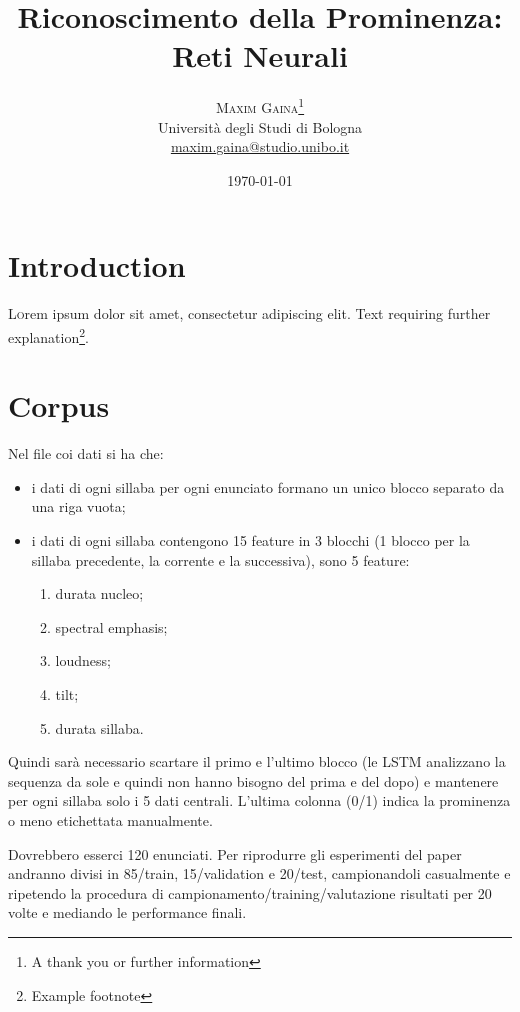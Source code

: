 \documentclass[twoside,twocolumn]{article}
\title{Riconoscimento della Prominenza: Reti Neurali} %
\author{%
\textsc{Maxim Gaina}\thanks{A thank you or further information} \\[1ex] %
\normalsize Università degli Studi di Bologna \\ %
\normalsize \href{mailto:maxim.gaina@studio.unibo.it}{maxim.gaina@studio.unibo.it}
}
\date{\today} %
\theoremstyle{definition}
\begin{document}
\maketitle

\section{Introduction}
	\lettrine[nindent=0em,lines=3]{L} orem ipsum dolor sit amet, consectetur adipiscing elit.
	Text requiring further explanation\footnote{Example footnote}.

\section{Corpus}
	Nel file coi dati si ha che:
	\begin{itemize}
		\item i dati di ogni sillaba per ogni enunciato formano un unico blocco separato da una riga vuota;
		\item i dati di ogni sillaba contengono 15 feature in 3 blocchi (1 blocco per la sillaba precedente, la corrente e la successiva), sono 5 feature:
		\begin{enumerate}
			\item durata nucleo;
			\item spectral emphasis;
			\item loudness;
			\item tilt;
			\item durata sillaba.
		\end{enumerate}
	\end{itemize}
	Quindi sarà necessario scartare il primo e l'ultimo blocco (le LSTM analizzano la 
	sequenza da sole e quindi non hanno bisogno del prima e del dopo) e mantenere per ogni sillaba solo i 5 dati centrali. L'ultima colonna (0/1) indica la prominenza o meno etichettata manualmente.
	
	Dovrebbero esserci 120 enunciati. Per riprodurre gli esperimenti del paper \cite{bib:prominence-detection-italian} andranno divisi in 85/train, 15/validation e 20/test, campionandoli casualmente e ripetendo la procedura di campionamento/training/valutazione risultati per 20 volte e mediando le performance finali.
	
\end{document}
